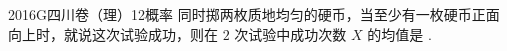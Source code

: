 
\begin{problem}{2016}{G}{四川卷（理）}{12}{概率}
同时掷两枚质地均匀的硬币，当至少有一枚硬币正面向上时，就说这次试验成功，则在 $ 2 $ 次试验中成功次数 $ X $ 的均值是 \underline{\hspace{4em}}.
\end{problem}

\begin{answer}

\end{answer}

\begin{solutions}

\end{solutions}